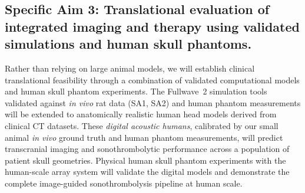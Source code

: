 \subsection{Specific Aim 3: Translational evaluation of integrated imaging and therapy using validated simulations and human skull phantoms.}
Rather than relying on large animal models, we will establish clinical translational feasibility through a combination of validated computational models and human skull phantom experiments. The Fullwave~2 simulation tools validated against \textit{in vivo} rat data (SA1, SA2) and human phantom measurements will be extended to anatomically realistic human head models derived from clinical CT datasets. These \textit{digital acoustic humans}, calibrated by our small animal \textit{in vivo} ground truth and human phantom measurements, will predict transcranial imaging and sonothrombolytic performance across a population of patient skull geometries. Physical human skull phantom experiments with the human-scale array system will validate the digital models and demonstrate the complete image-guided sonothrombolysis pipeline at human scale.

